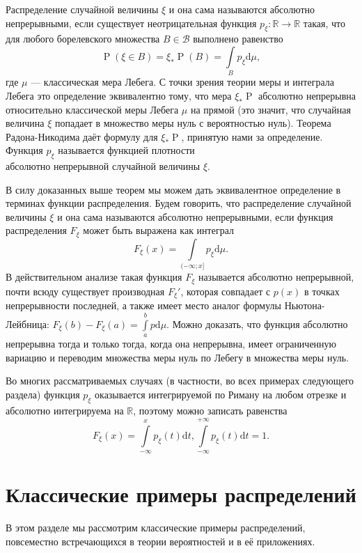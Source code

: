 \documentclass[12pt]{article}
\numberwithin{theorem}{section}
\theoremstyle{definition}
\newcommand{\defin}[2]{\hypertarget{#2}{{\color{red} #1}}}
\newcommand{\RR}{\mathbb{R}}
\newcommand{\calB}{\mathcal{B}}
\newcommand{\prob}{\operatorname{P}}
\newcommand{\diff}{\mathrm{d}}
\begin{document}
	Распределение случайной величины $ \xi $ и она сама называются \defin{абсолютно непрерывными}{absolutely-continuous},
	если существует неотрицательная функция $ p_\xi \colon \mathbb{R} \to \mathbb{R} $ такая, что
	для любого борелевского множества $ B \in \calB $ выполнено равенство
	$$ \prob(\xi \in B) = \xi_*\prob(B) = \int\limits_{B} p_\xi\diff\mu, $$
	где $ \mu $ --- классическая мера Лебега.
	С точки зрения теории меры и интеграла Лебега это определение эквивалентно тому,
	что мера $ \xi_*\prob $ абсолютно непрерывна относительно классической меры Лебега $ \mu $ на прямой
	(это значит, что случайная величина $ \xi $ попадает в множество меры нуль с вероятностью нуль).
	Теорема Радона-Никодима даёт формулу для $ \xi_*\prob $, принятую нами за определение.
	Функция $ p_\xi $ называется \defin{функцией плотности}{probability-density-function} \\
	абсолютно непрерывной случайной величины $ \xi $.
	
	В силу доказанных выше теорем мы можем дать эквивалентное определение в терминах функции распределения.
	Будем говорить, что распределение случайной величины $ \xi $ и она сама называются \defin{абсолютно непрерывными}{absolutely-continuous-2}, если функция распределения $ F_\xi $ может быть выражена как интеграл
	$$ F_\xi(x) = \int\limits_{(-\infty; x]} p_\xi\diff\mu. $$
	В действительном анализе такая функция $ F_\xi $ называется абсолютно непрерывной,
	почти всюду существует производная $ F_\xi' $, которая совпадает с $ p(x) $ в точках непрерывности последней,
	а также имеет место аналог формулы Ньютона-Лейбница: $ F_\xi(b) - F_\xi(a) = \int\limits_{a}^{b} p\diff\mu $.
	Можно доказать, что функция абсолютно непрерывна тогда и только тогда,
	когда она непрерывна, имеет ограниченную вариацию и переводим множества меры нуль по Лебегу в множества меры нуль.
	
	Во многих рассматриваемых случаях (в частности, во всех примерах следующего раздела) 
	функция $ p_\xi $ оказывается интегрируемой по Риману на любом отрезке
	и абсолютно интегрируема на $ \RR $, поэтому можно записать равенства
	$$ F_\xi(x) = \int\limits_{-\infty}^{x} p_\xi(t)\diff t, \int\limits_{-\infty}^{+\infty} p_\xi(t)\diff t = 1. $$
	
	\section{Классические примеры распределений} 
	
	В этом разделе мы рассмотрим классические примеры распределений,
	повсеместно встречающихся в теории вероятностей и в её приложениях.
	
\end{document}
